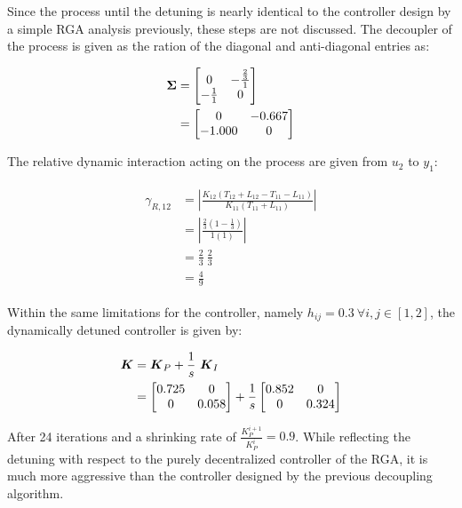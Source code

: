 Since the process until the detuning is nearly identical to the controller design by a simple RGA analysis previously, these steps are not discussed. The decoupler of the process is given as the ration of the diagonal and anti-diagonal entries as:

\begin{align*}
\begin{split}
\mbox{\boldmath$\Sigma$} &= \begin{bmatrix}
0 & -\frac{\frac{2}{3}}{1} \\
-\frac{1}{1} & 0
\end{bmatrix}
\\
&= \begin{bmatrix}
0 & -0.667 \\
-1.000 & 0
\end{bmatrix}
\end{split}
\end{align*}

The relative dynamic interaction acting on the process are given from $u_2$ to $y_1$:

\begin{align*}
\begin{split}
\gamma_{R,12} &= \left|\frac{K_{12} \left( T_{12} + L_{12}  - T_{11} - L_{11} \right)}{K_{11} \left( T_{11} + L_{11}\right)} \right| \\
&= \left|\frac{\frac{2}{3} \left( 1  - \frac{1}{3} \right)}{1 \left( 1\right)} \right| \\
&= \frac{2}{3} ~\frac{2}{3}\\
&= \frac{4}{9}
\end{split}
\end{align*}

Within the same limitations for the controller, namely $h_{ij} = 0.3 ~ \forall i,j \in [1,2]$, the dynamically detuned controller is given by:

\begin{align*}
\mbox{\boldmath$K$} &= \mbox{\boldmath$K$}_P + \frac{1}{s}~ \mbox{\boldmath$K$}_I\\
&= \begin{bmatrix}
0.725 & 0 \\
0 & 0.058
\end{bmatrix}
+ \frac{1}{s}\begin{bmatrix}
0.852 & 0 \\
0 & 0.324
\end{bmatrix}
\end{align*}

After 24 iterations and a shrinking rate of $\frac{K_P^{i+1}}{K_P^{i}} = 0.9 $. While reflecting the detuning with respect to the purely decentralized controller of the RGA, it is much more aggressive than the controller designed by the previous decoupling algorithm. \\

